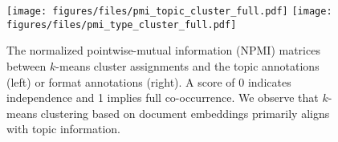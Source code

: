 \begin{figure}[!ht]
    \centering
    \texttt{[image: figures/files/pmi\_topic\_cluster\_full.pdf]}%
    \texttt{[image: figures/files/pmi\_type\_cluster\_full.pdf]}
    \caption{The normalized pointwise-mutual information (NPMI) matrices between $k$-means cluster assignments and the {\topics topic annotations} (left) or {\formats format annotations} (right). A score of 0 indicates independence and 1 implies full co-occurrence. We observe that $k$-means clustering based on document embeddings primarily aligns with topic information.}  
    \label{fig:pmi_clusters}
\end{figure}
